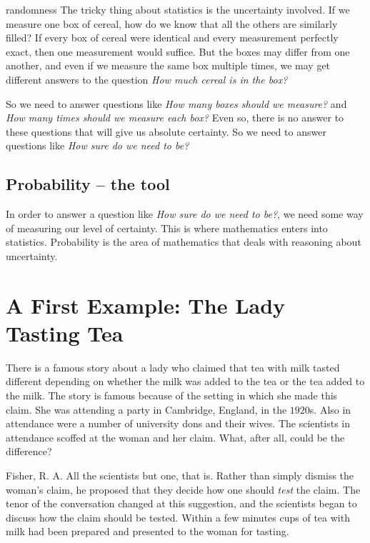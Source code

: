 \documentclass[]{book}
\begin{document}
randomness
The tricky thing about statistics is the uncertainty involved. If we measure one box of cereal, how do we know that all the others are similarly filled? If every box of cereal were identical and every measurement perfectly exact, then one measurement would suffice. But the boxes may differ from one another, and even if we measure the same box multiple times, we may get different answers to the question
\emph{How much cereal is in the box?}

So we need to answer questions like
\emph{How many boxes should we measure?}
and
\emph{How many times should we measure each box?}
Even so, there is no answer to these questions
that will give us absolute certainty.
So we need to answer questions like
\emph{How sure do we need to be?}

\hypertarget{probability-the-tool}{%
\subsection{Probability -- the tool}\label{probability-the-tool}}

In order to answer a question like \emph{How sure do we need to be?}, we need some way of measuring our level of certainty. This is where mathematics enters into statistics. Probability is the area of mathematics that deals with reasoning about uncertainty.

\hypertarget{a-first-example-the-lady-tasting-tea}{%
\section{A First Example: The Lady Tasting Tea}\label{a-first-example-the-lady-tasting-tea}}

There is a famous story about a lady who claimed that tea with milk tasted different depending on whether the milk was added to the tea or the tea added to the milk. The story is famous because of the setting in which she made this claim. She was attending a party in Cambridge, England, in the \(1920\)s. Also in attendance were a number of university dons and their wives. The scientists in attendance scoffed at the woman and her claim. What, after all, could be the difference?

Fisher, R. A.
All the scientists but one, that is. Rather than simply dismiss the woman's claim, he proposed that they decide how one should \emph{test} the claim. The tenor of the conversation changed at this suggestion, and the scientists began to discuss how the claim should be tested. Within a few minutes cups of tea with milk had been prepared and presented to the woman for tasting.
\end{document}
